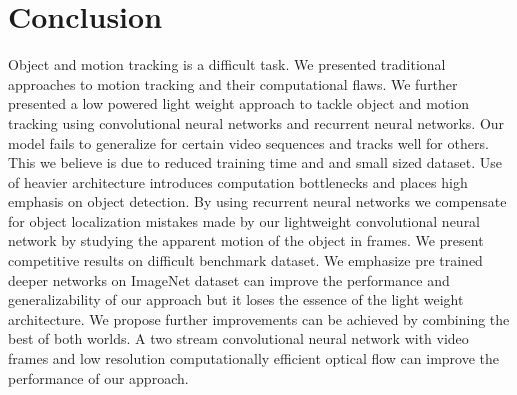 \documentclass[sigconf]{acmart}
\begin{document}
\section{Conclusion} \label{conclusion}

Object and motion tracking is a difficult task. We presented traditional approaches to motion tracking and their computational flaws. We further presented a low powered light weight approach to tackle object and motion tracking using convolutional neural networks and recurrent neural networks. Our model fails to generalize for certain video sequences and tracks well for others. This we believe is due to reduced training time and and small sized dataset. Use of heavier architecture introduces computation bottlenecks and places high emphasis on object detection. By using recurrent neural networks we compensate for object localization mistakes made by our lightweight convolutional neural network by studying the apparent motion of the object in frames. We present competitive results on difficult benchmark dataset. We emphasize pre trained deeper networks on ImageNet dataset can improve the performance and generalizability of our approach but it loses the essence of the light weight architecture. We propose further improvements can be achieved by combining the best of both worlds. A two stream convolutional neural network with video frames and low resolution computationally efficient optical flow can improve the performance of our approach. 



 
\end{document}
